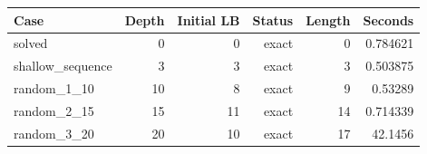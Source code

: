 {\small
\begin{tabular}{lrrrrr}
\hline
Case & Depth & Initial LB & Status & Length & Seconds \\
\hline
solved & 0 & 0 & exact & 0 & 0.784621 \\
shallow\_sequence & 3 & 3 & exact & 3 & 0.503875 \\
random\_1\_10 & 10 & 8 & exact & 9 & 0.53289 \\
random\_2\_15 & 15 & 11 & exact & 14 & 0.714339 \\
random\_3\_20 & 20 & 10 & exact & 17 & 42.1456 \\
\hline
\end{tabular}
}

